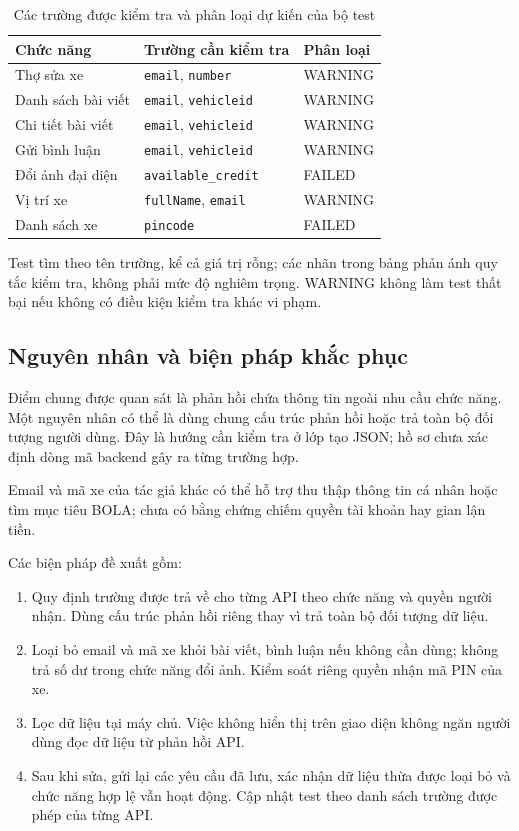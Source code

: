 \documentclass[oneside,a4paper,12pt]{extreport}
\begin{document}
\begin{table}[htbp]
\centering
\caption{Các trường được kiểm tra và phân loại dự kiến của bộ test}
\label{tab:exposure-tests}
\begin{tabularx}{\textwidth}{@{} p{} X l @{}}
\toprule
\textbf{Chức năng} & \textbf{Trường cần kiểm tra} & \textbf{Phân loại} \\
\midrule
Thợ sửa xe & \texttt{email}, \texttt{number} & WARNING \\
Danh sách bài viết & \texttt{email}, \texttt{vehicleid} & WARNING \\
Chi tiết bài viết & \texttt{email}, \texttt{vehicleid} & WARNING \\
Gửi bình luận & \texttt{email}, \texttt{vehicleid} & WARNING \\
Đổi ảnh đại diện & \texttt{available\_credit} & FAILED \\
Vị trí xe & \texttt{fullName}, \texttt{email} & WARNING \\
Danh sách xe & \texttt{pincode} & FAILED \\
\bottomrule
\end{tabularx}
\end{table}

Test tìm theo tên trường, kể cả giá trị rỗng; các nhãn trong bảng
phản ánh quy tắc kiểm tra, không phải mức độ nghiêm trọng. WARNING
không làm test thất bại nếu không có điều kiện kiểm tra khác vi phạm.

\clearpage
\subsection{Nguyên nhân và biện pháp khắc phục}

Điểm chung được quan sát là phản hồi chứa thông tin ngoài nhu cầu chức
năng. Một nguyên nhân có thể là dùng chung cấu trúc phản hồi hoặc trả
toàn bộ đối tượng người dùng. Đây là hướng cần kiểm tra ở lớp tạo JSON;
hồ sơ chưa xác định dòng mã backend gây ra từng trường hợp.

Email và mã xe của tác giả khác có thể hỗ trợ thu thập thông tin cá
nhân hoặc tìm mục tiêu BOLA; chưa có bằng chứng chiếm quyền tài khoản
hay gian lận tiền.

Các biện pháp đề xuất gồm:
\begin{enumerate}
    \item Quy định trường được trả về cho từng API theo chức năng và
    quyền người nhận. Dùng cấu trúc phản hồi riêng thay vì trả toàn bộ
    đối tượng dữ liệu.
    \item Loại bỏ email và mã xe khỏi bài viết, bình luận nếu không cần
    dùng; không trả số dư trong chức năng đổi ảnh. Kiểm soát riêng quyền
    nhận mã PIN của xe.
    \item Lọc dữ liệu tại máy chủ. Việc không hiển thị trên giao diện
    không ngăn người dùng đọc dữ liệu từ phản hồi API.
    \item Sau khi sửa, gửi lại các yêu cầu đã lưu, xác nhận dữ liệu thừa
    được loại bỏ và chức năng hợp lệ vẫn hoạt động. Cập nhật test theo
    danh sách trường được phép của từng API.
\end{enumerate}
\end{document}
